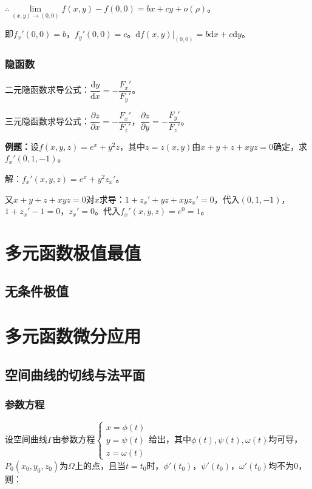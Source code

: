 \documentclass[UTF8, 12pt]{ctexart}
\begin{document}
$\therefore\lim\limits_{(x,y)\to(0,0)}f(x,y)-f(0,0)=bx+cy+o(\rho)$。

即$f_x'(0,0)=b$，$f_y'(0,0)=c$。$\textrm{d}f(x,y)|_{(0,0)}=b\textrm{d}x+c\textrm{d}y$。

\subsubsection{隐函数}

二元隐函数求导公式：$\dfrac{\textrm{d}y}{\textrm{d}x}=-\dfrac{F_x'}{F_y'}$。

三元隐函数求导公式：$\dfrac{\partial z}{\partial x}=-\dfrac{F_x'}{F_z'}$，$\dfrac{\partial z}{\partial y}=-\dfrac{F_y'}{F_z'}$。

\textbf{例题：}设$f(x,y,z)=e^x+y^2z$，其中$z=z(x,y)$由$x+y+z+xyz=0$确定，求$f_x'(0,1,-1)$。

解：$f_x'(x,y,z)=e^x+y^2z_x'$。

又$x+y+z+xyz=0$对$x$求导：$1+z_x'+yz+xyz_x'=0$，代入$(0,1,-1)$，$1+z_x'-1=0$，$z_x'=0$。代入$f_x'(x,y,z)=e^0=1$。

\section{多元函数极值最值}

\subsection{无条件极值}

\section{多元函数微分应用}

\subsection{空间曲线的切线与法平面}

\subsubsection{参数方程}

设空间曲线$\varGamma$由参数方程$\left\{\begin{array}{l}
    x=\phi(t) \\
    y=\psi(t) \\
    z=\omega(t)
\end{array}\right.$给出，其中$\phi(t),\psi(t),\omega(t)$均可导，$P_0(x_0,y_0,z_0)$为$\varOmega$上的点，且当$t=t_0$时，$\phi'(t_0)$，$\psi'(t_0)$，$\omega'(t_0)$均不为0，则：
\end{document}

